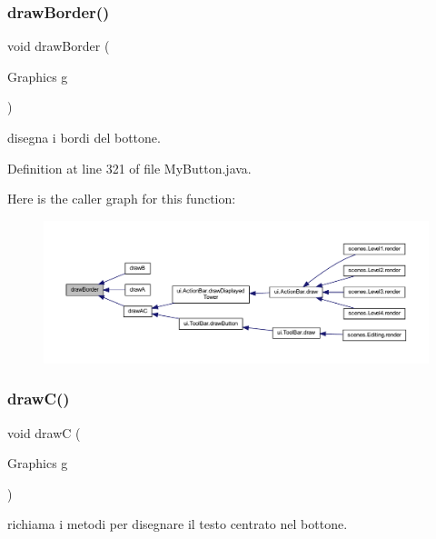 \subsubsection{\texorpdfstring{draw\+Border()}{drawBorder()}}
{\footnotesize\ttfamily void draw\+Border (\begin{DoxyParamCaption}\item[{Graphics}]{g }\end{DoxyParamCaption})\hspace{0.3cm}{\ttfamily [private]}}



disegna i bordi del bottone. 



Definition at line 321 of file My\+Button.\+java.

Here is the caller graph for this function\+:\nopagebreak
\begin{figure}[H]
\begin{center}
\leavevmode
\includegraphics[width=350pt]{classui_1_1_my_button_af91752554b78073a295ed441afc34638_icgraph}
\end{center}
\end{figure}
\mbox{\label{classui_1_1_my_button_a56e66f982bfd587482db32cb63e608c4}} 
\subsubsection{\texorpdfstring{draw\+C()}{drawC()}}
{\footnotesize\ttfamily void drawC (\begin{DoxyParamCaption}\item[{Graphics}]{g }\end{DoxyParamCaption})}



richiama i metodi per disegnare il testo centrato nel bottone. 



